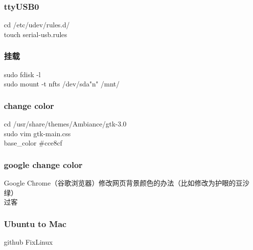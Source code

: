 \documentclass{beamer}
\newcommand{\quotes}[1]{"#1"}
\begin{document}
\begin{CJK}{UTF8}{gkai}
    \begin{frame}\frametitle{ttyUSB0}
        cd /etc/udev/rules.d/ \\
        touch serial-usb.rules\\
    \end{frame}

    \begin{frame}\frametitle{挂载}
        sudo fdisk -l\\
        sudo mount -t nfts /dev/sda\quotes{n} /mnt/
    \end{frame}

    \begin{frame}\frametitle{change color}
        cd /usr/share/themes/Ambiance/gtk-3.0\\ %
        sudo vim gtk-main.css\\
        base\_color \#cce8cf\\
    \end{frame}

    \begin{frame}\frametitle{google change color}
        Google Chrome（谷歌浏览器）修改网页背景颜色的办法（比如修改为护眼的豆沙绿）  \\
        过客\\
    \end{frame}



    \begin{frame}\frametitle{Ubuntu to Mac}
        github FixLinux 
    \end{frame}

\end{CJK}
\end{document}
